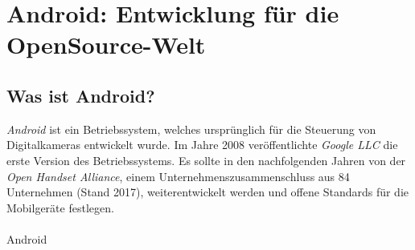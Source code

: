 \section{Android: Entwicklung für die OpenSource-Welt}
\label{android}

\subsection{Was ist Android?}
\textit{Android} ist ein Betriebssystem, welches ursprünglich für die Steuerung von Digitalkameras
entwickelt wurde. Im Jahre 2008 veröffentlichte \textit{Google LLC} die erste Version des
Betriebssystems. Es sollte in den nachfolgenden Jahren von der \textit{Open Handset Alliance}, einem
Unternehmenszusammenschluss aus 84 Unternehmen (Stand 2017), weiterentwickelt werden und offene
Standards für die Mobilgeräte festlegen. \\ \\

Android 